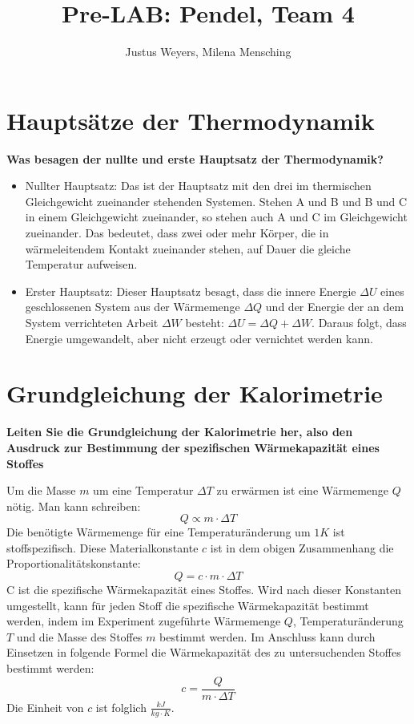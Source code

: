 \documentclass[a4paper, 12pt]{article}
\title{Pre-LAB: Pendel, Team 4}
\author{Justus Weyers, Milena Mensching}
\begin{document}
\maketitle
\section{Hauptsätze der Thermodynamik}
\textbf{Was besagen der nullte und erste Hauptsatz der Thermodynamik?}

\begin{itemize}
\item Nullter Hauptsatz: Das ist der Hauptsatz mit den drei im thermischen Gleichgewicht zueinander stehenden Systemen. Stehen A und B und B und C in einem Gleichgewicht zueinander, so stehen auch A und C im Gleichgewicht zueinander. Das bedeutet, dass zwei oder mehr Körper, die in wärmeleitendem Kontakt zueinander stehen, auf Dauer die gleiche Temperatur aufweisen.  
\item Erster Hauptsatz: Dieser Hauptsatz besagt, dass die innere Energie $\Delta U$ eines geschlossenen System aus der Wärmemenge $\Delta Q$ und der Energie der an dem System verrichteten Arbeit $\Delta W$ besteht: $\Delta U=\Delta Q + \Delta W$. Daraus folgt, dass Energie umgewandelt, aber nicht erzeugt oder vernichtet werden kann. 
\end{itemize}

\section{Grundgleichung der Kalorimetrie}
\textbf{Leiten Sie die Grundgleichung der Kalorimetrie her, also den Ausdruck zur Bestimmung
der spezifischen Wärmekapazität eines Stoffes}

Um die Masse $m$ um eine Temperatur $\Delta T$ zu erwärmen ist eine Wärmemenge $Q$ nötig. Man kann schreiben:
$$Q \propto m \cdot \Delta T$$
Die benötigte Wärmemenge für eine Temperaturänderung um $1K$ ist stoffspezifisch. Diese Materialkonstante $c$ ist in dem obigen Zusammenhang die Proportionalitätskonstante:
$$Q = c \cdot m \cdot \Delta T$$
C ist die spezifische Wärmekapazität eines Stoffes.
Wird nach dieser Konstanten umgestellt, kann für jeden Stoff die spezifische Wärmekapazität bestimmt werden, indem im Experiment zugeführte Wärmemenge $Q$, Temperaturänderung $T$ und die Masse des Stoffes $m$ bestimmt werden. Im Anschluss kann durch Einsetzen in folgende Formel die Wärmekapazität des zu untersuchenden Stoffes bestimmt werden:
$$c=\frac{Q}{m \cdot \Delta T}$$ 
Die Einheit von $c$ ist folglich $\frac{kJ}{kg \cdot K}$.
\end{document}
